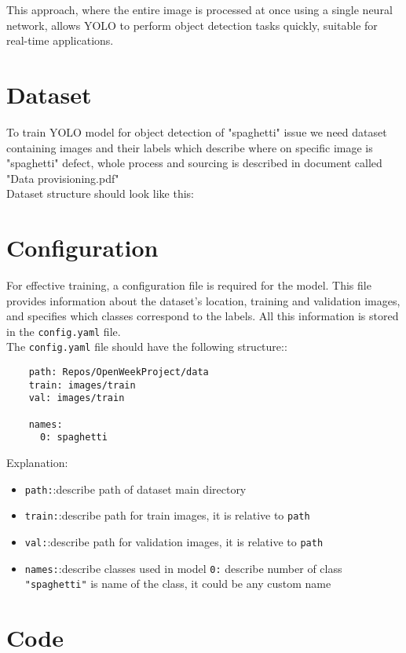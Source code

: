 \documentclass[12pt,a4paper]{article}
\begin{document}
This approach, where the entire image is processed at once using a single neural network, allows YOLO to perform object detection tasks quickly, suitable for real-time applications.

\section{Dataset}
To train YOLO model for object detection of "spaghetti" issue we need dataset containing images and their labels which describe where on specific image is "spaghetti" defect, whole process and sourcing is described in document called "Data provisioning.pdf"\\
Dataset structure should look like this:
\smallbreak
{}

\section{Configuration}
For effective training, a configuration file is required for the model. This file provides information about the dataset's location, training and validation images, and specifies which classes correspond to the labels. All this information is stored in the \verb|config.yaml| file. \\
The \verb|config.yaml|  file should have the following structure::
\begin{verbatim}
    path: Repos/OpenWeekProject/data 
    train: images/train 
    val: images/train 

    names:
      0: spaghetti 
\end{verbatim}
Explanation:
\begin{itemize}
    \item \verb|path:|:describe path of dataset main directory
    \item \verb|train:|:describe path for train images, it is relative to \verb|path|
    \item \verb|val:|:describe path for validation images, it is relative to \verb|path|
    \item \verb|names:|:describe classes used in model
    \subitem \verb|0:| describe number of class
    \subitem \verb|"spaghetti"| is name of the class, it could be any custom name
\end{itemize}

\section{Code}
\end{document}
